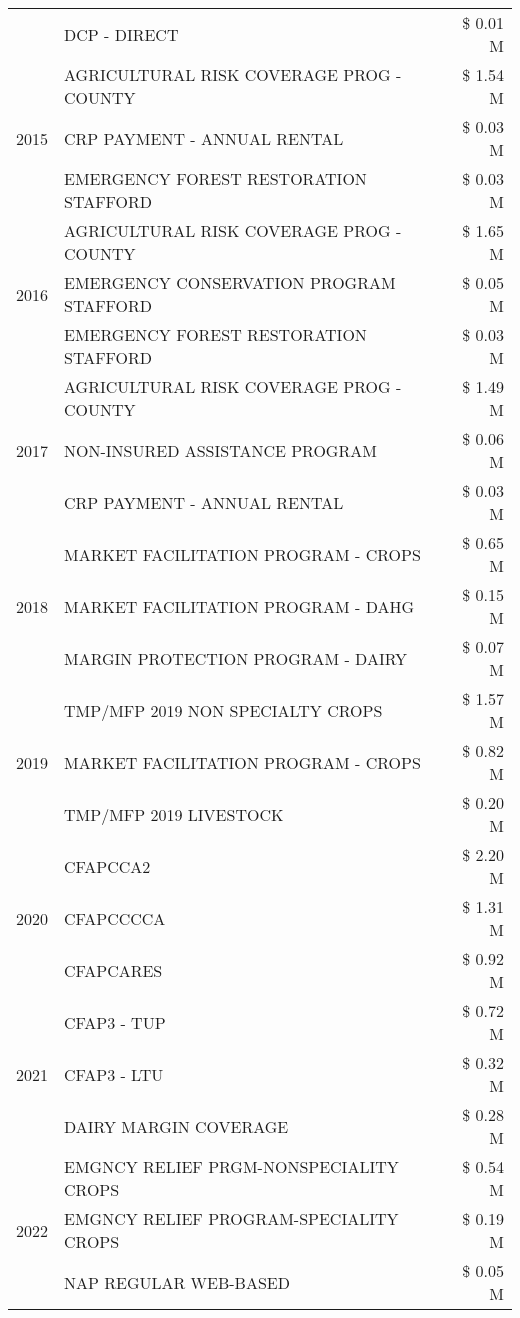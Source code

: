 \begin{tabular}{llr}
 & DCP - DIRECT & \$ 0.01 M \\
\cline{1-3}
\multirow[t]{3}{*}{2015} & AGRICULTURAL RISK COVERAGE PROG - COUNTY & \$ 1.54 M \\
 & CRP PAYMENT - ANNUAL RENTAL & \$ 0.03 M \\
 & EMERGENCY FOREST RESTORATION STAFFORD & \$ 0.03 M \\
\cline{1-3}
\multirow[t]{3}{*}{2016} & AGRICULTURAL RISK COVERAGE PROG - COUNTY & \$ 1.65 M \\
 & EMERGENCY CONSERVATION PROGRAM STAFFORD & \$ 0.05 M \\
 & EMERGENCY FOREST RESTORATION STAFFORD & \$ 0.03 M \\
\cline{1-3}
\multirow[t]{3}{*}{2017} & AGRICULTURAL RISK COVERAGE PROG - COUNTY & \$ 1.49 M \\
 & NON-INSURED ASSISTANCE PROGRAM & \$ 0.06 M \\
 & CRP PAYMENT - ANNUAL RENTAL & \$ 0.03 M \\
\cline{1-3}
\multirow[t]{3}{*}{2018} & MARKET FACILITATION PROGRAM - CROPS & \$ 0.65 M \\
 & MARKET FACILITATION PROGRAM - DAHG & \$ 0.15 M \\
 & MARGIN PROTECTION PROGRAM - DAIRY & \$ 0.07 M \\
\cline{1-3}
\multirow[t]{3}{*}{2019} & TMP/MFP 2019 NON SPECIALTY CROPS & \$ 1.57 M \\
 & MARKET FACILITATION PROGRAM - CROPS & \$ 0.82 M \\
 & TMP/MFP 2019 LIVESTOCK & \$ 0.20 M \\
\cline{1-3}
\multirow[t]{3}{*}{2020} & CFAPCCA2 & \$ 2.20 M \\
 & CFAPCCCCA & \$ 1.31 M \\
 & CFAPCARES & \$ 0.92 M \\
\cline{1-3}
\multirow[t]{3}{*}{2021} & CFAP3 - TUP & \$ 0.72 M \\
 & CFAP3 - LTU & \$ 0.32 M \\
 & DAIRY MARGIN COVERAGE & \$ 0.28 M \\
\cline{1-3}
\multirow[t]{3}{*}{2022} & EMGNCY RELIEF PRGM-NONSPECIALITY CROPS & \$ 0.54 M \\
 & EMGNCY RELIEF PROGRAM-SPECIALITY CROPS & \$ 0.19 M \\
 & NAP REGULAR WEB-BASED & \$ 0.05 M \\
\cline{1-3}
\bottomrule
\end{tabular}
